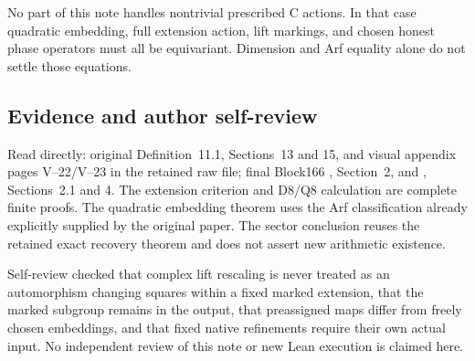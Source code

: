 No part of this note handles nontrivial prescribed C actions. In that
case quadratic embedding, full extension action, lift markings, and
chosen honest phase operators must all be equivariant. Dimension and Arf equality alone do not settle those equations.

\hypertarget{dyadic_markings-evidence-and-author-self-review}{%
\subsection{Evidence and author
self-review}\label{dyadic_markings-evidence-and-author-self-review}}

Read directly: original Definition~11.1, Sections~13 and 15, and visual
appendix pages V--22/V--23 in the retained raw file; final Block166
, Section~2, and , Sections~2.1
and 4. The extension criterion and D8/Q8 calculation are complete finite
proofs. The quadratic embedding theorem uses the Arf classification
already explicitly supplied by the original paper. The sector conclusion
reuses the retained exact recovery theorem and does not assert new
arithmetic existence.

Self-review checked that complex lift rescaling is never treated as an
automorphism changing squares within a fixed marked extension, that the
marked subgroup remains in the output, that preassigned maps differ from
freely chosen embeddings, and that fixed native refinements require
their own actual input. No independent review of this note or new Lean
execution is claimed here.

